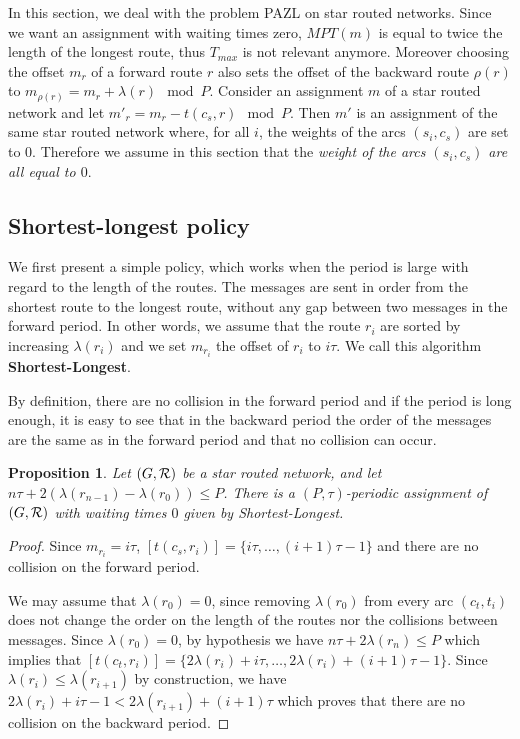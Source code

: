 \documentclass[10pt, conference, letterpaper]{IEEEtran}
\newtheorem{proposition}{Proposition}
\begin{document}
       In this section, we deal with the problem PAZL on star routed networks. Since we want an assignment with waiting times zero, $MPT(m)$ is equal to twice the length of the longest route, thus $T_{max}$ is not relevant anymore. Moreover choosing the offset $m_r$ of a forward route $r$ also sets the offset of the backward route $\rho(r)$ to $m_{\rho(r)} = m_{r} + \lambda(r) \mod P$.  Consider an assignment $m$ of a star routed network and let $m'_r= m_{r} - t(c_s,r) \mod P$. Then $m'$ is an assignment of the same star routed network where, for all $i$, the weights of the arcs $(s_i,c_s)$ are set to $0$. Therefore we assume in this section that the \emph{weight of the arcs $(s_i,c_s)$ are all equal to $0$}.
      
      
\subsection{Shortest-longest policy}
    

    We first present a simple policy, which works when the period is large with regard to the length of the routes.
    The messages are sent in order from the shortest route to the longest route, without any gap between two messages in the forward period.
    In other words, we assume that the route $r_i$ are sorted by increasing $\lambda(r_i)$ and we set $m_{r_i}$ the offset of $r_i$ to $i\tau$. We call this algorithm {\bf Shortest-Longest}.
      
     By definition, there are no collision in the forward period and if the period is long enough, 
     it is easy to see that in the backward period the order of the messages are the same as in the forward period and that no collision can occur. 
      
      
      \begin{proposition} Let $(G, {\cal R})$ be a star routed network, and let $n\tau + 2(\lambda(r_{n-1}) - \lambda(r_{0})) \leq P$. There is a $(P,\tau)$-periodic assignment of $(G, {\cal R})$ with waiting times $0$ given by Shortest-Longest.\label{prop:SL}
      \end{proposition}
      \begin{proof}
       Since $m_{r_i} = i\tau$, $[t(c_s,r_{i})] = \{i\tau,\dots, (i+1)\tau -1\}$ and there are no collision on the forward period.
       
       
       We may assume that $\lambda(r_{0}) = 0$, since removing $\lambda(r_{0})$ from every arc $(c_t,t_i)$ does not change the order on the length of the routes nor the collisions between messages.
       Since $\lambda(r_{0}) = 0$, by hypothesis we have $n\tau + 2\lambda(r_{n}) \leq P$ which implies that
       $[t(c_t,r_{i})] = \{2 \lambda(r_{i}) + i\tau, \dots,  2 \lambda(r_{i}) + (i+1)\tau -1\}$.
       Since $ \lambda(r_{i}) \leq  \lambda(r_{i+1})$ by construction, we have  $2 \lambda(r_{i}) + i\tau -1 < 2 \lambda(r_{i+1}) + (i+1)\tau$ which proves that there are no collision on the backward period. 
      \end{proof}
\end{document}
